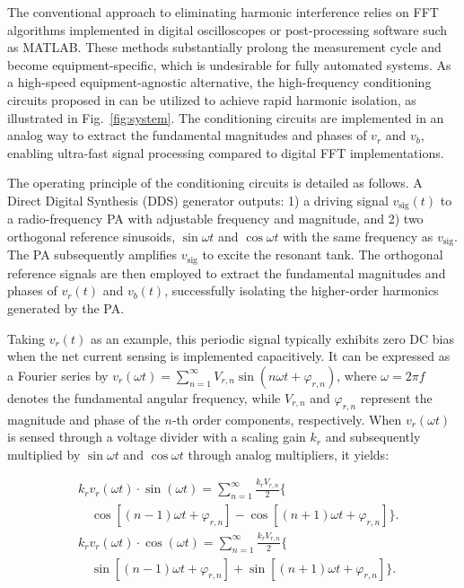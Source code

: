 \documentclass[conference]{IEEEtran}
\begin{document}
The conventional approach to eliminating harmonic interference relies on FFT algorithms implemented in digital oscilloscopes or post-processing software such as MATLAB. These methods substantially prolong the measurement cycle and become equipment-specific, which is undesirable for fully automated systems. As a high-speed equipment-agnostic alternative, the high-frequency conditioning circuits proposed in \cite{hwang} can be utilized to achieve rapid harmonic isolation, as illustrated in Fig.~\ref{fig:system}. The conditioning circuits are implemented in an analog way to extract the fundamental magnitudes and phases of $v_r$ and $v_b$, enabling ultra-fast signal processing compared to digital FFT implementations.

The operating principle of the conditioning circuits is detailed as follows. A Direct Digital Synthesis (DDS) generator outputs: 1) a driving signal $v_{\text{sig}}(t)$ to a radio-frequency PA with adjustable frequency and magnitude, and 2) two orthogonal reference sinusoids, $\sin\omega t$ and $\cos\omega t$ with the same frequency as $v_{\text{sig}}$. The PA subsequently amplifies $v_{\text{sig}}$ to excite the resonant tank. The orthogonal reference signals are then employed 
to extract the fundamental magnitudes and phases of $v_r(t)$ and $v_b(t)$, successfully isolating the higher-order harmonics generated by the PA.

Taking $v_r(t)$ as an example, this periodic signal typically exhibits zero DC bias when the net current sensing is implemented capacitively. It can be expressed as a Fourier series by $v_r(\omega t) = \sum_{n=1}^{\infty} V_{r,n} \sin(n\omega t + \varphi_{r,n})$, where $\omega=2\pi f$ denotes the fundamental angular frequency, while $V_{r,n}$ and $\varphi_{r,n}$ represent the magnitude and phase of the $n$-th order components, respectively. When $v_r(\omega t)$ is sensed through a voltage divider with a scaling gain $k_r$ and subsequently multiplied by $\sin\omega t$ and $\cos\omega t$ through analog multipliers, it yields:

\begin{subequations}
\label{eq:harmonics_sub}
\begin{align}
&k_r v_r(\omega t) \cdot \sin(\omega t) = \sum_{n=1}^{\infty} \frac{k_r V_{r,n}}{2} \Big\{ \nonumber \\
&\quad \cos\left[ (n-1)\omega t + \varphi_{r,n} \right] - \cos\left[ (n+1)\omega t + \varphi_{r,n} \right] \Big\}. \label{eq:harmonics_sin} \\[1.5ex]
&k_r v_r(\omega t) \cdot \cos(\omega t) = \sum_{n=1}^{\infty} \frac{k_r V_{r,n}}{2} \Big\{ \nonumber \\
&\quad \sin\left[ (n-1)\omega t + \varphi_{r,n} \right] + \sin\left[ (n+1)\omega t + \varphi_{r,n} \right] \Big\}. \label{eq:harmonics_cos}
\end{align}
\end{subequations}
\end{document}
